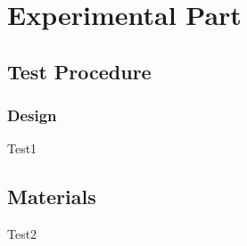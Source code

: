 \chapter{Experimental Part}

\section{Test Procedure}
\subsection{Design}

Test1

\section{Materials}

Test2